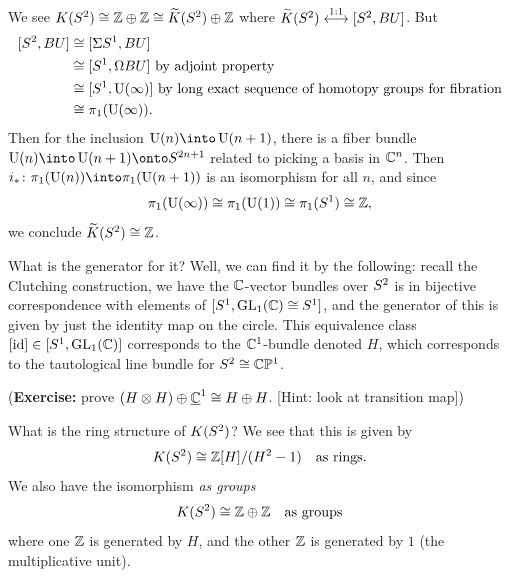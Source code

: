 \begin{example}
We see $K(S^{2})\cong\mathbb{Z}\oplus\mathbb{Z}\cong\widetilde{K}(S^{2})\oplus\mathbb{Z}$
where $\widetilde{K}(S^{2})\stackrel{1:1}{\longleftrightarrow}[S^{2},BU]$.
But
\begin{subequations}
  \begin{align}
[S^{2},BU]
&\cong[\Sigma S^{1},BU]\\
&\cong[S^{1},\Omega BU]\mbox{ by adjoint property}\\
&\cong[S^{1},\operatorname{U}(\infty)] \mbox{ by long exact sequence of homotopy
  groups for fibration}\\
&\cong\pi_{1}(\operatorname{U}(\infty)).
  \end{align}
\end{subequations}
Then for the inclusion $\U(n)\into\U(n+1)$, there is a fiber bundle
$\U(n)\into\U(n+1)\onto\sphere{2n+1}$ related to picking a basis in
$\mathbb{C}^{n}$. Then $i_{*}\colon\pi_{1}(\U(n))\into\pi_{1}(\U(n+1))$ is an
isomorphism for all $n$, and since
\begin{equation}
\pi_{1}(\operatorname{U}(\infty))\cong\pi_{1}(\operatorname{U}(1))\cong\pi_{1}(S^{1})\cong\mathbb{Z},
\end{equation}
we conclude $\widetilde{K}(S^{2})\cong\mathbb{Z}$.

What is the generator for it? Well, we can find it by the following:
recall the Clutching construction, we have the $\mathbb{C}$-vector bundles
over $S^{2}$ is in bijective correspondence with elements of $[S^{1},\operatorname{GL}_{1}(\mathbb{C})\cong S^{1}]$,
and the generator of this is given by just the identity map on the
circle.
This equivalence class $[\operatorname{id}]\in[S^{1},\operatorname{GL}_{1}(\mathbb{C})]$ corresponds
to the $\mathbb{C}^{1}$-bundle denoted $H$, which corresponds to the
tautological line bundle for $S^{2}\cong\mathbb{C}\mathbb{P}^{1}$.

(\textbf{Exercise:} prove $(H\otimes
H)\oplus\underline{\mathbb{C}}^{1}\cong H\oplus H$. [Hint: look at
  transition map])

What is the ring structure of $K(S^{2})$? We see that this is
given by
\begin{equation}
K(S^{2})\cong\mathbb{Z}[H]/(H^{2}-1)\quad\mbox{as rings}.
\end{equation}
We also have the isomorphism \emph{as groups}
\begin{equation}
K(S^{2})\cong\mathbb{Z}\oplus\mathbb{Z}\quad\mbox{as groups}
\end{equation}
where one $\mathbb{Z}$ is generated by $H$, and the other $\mathbb{Z}$ is generated
by $1$ (the multiplicative unit).
\end{example}

